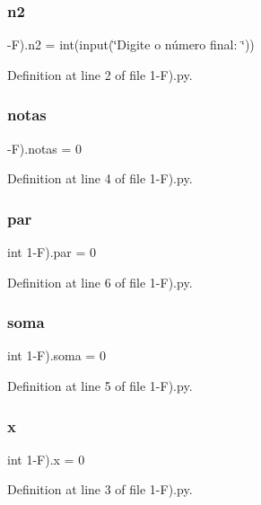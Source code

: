 \subsubsection{n2}
{\footnotesize{}-\/F).n2 = int(input(\char`\"{}Digite o número final\+: \char`\"{}))}



Definition at line 2 of file 1-\/\+F).\+py.

\mbox{\label{namespace1-_f_08_ae5ee231d2cd92f7b0715434b27df1de2}} 
\subsubsection{notas}
{\footnotesize{}-\/F).notas = 0}



Definition at line 4 of file 1-\/\+F).\+py.

\mbox{\label{namespace1-_f_08_afc12ddaa67e43260f028d13663bc3cc6}} 
\subsubsection{par}
{\footnotesize\ttfamily int 1-\/F).par = 0}



Definition at line 6 of file 1-\/\+F).\+py.

\mbox{\label{namespace1-_f_08_ac2bb87f0483755b71d396ef55ccd4c47}} 
\subsubsection{soma}
{\footnotesize\ttfamily int 1-\/F).soma = 0}



Definition at line 5 of file 1-\/\+F).\+py.

\mbox{\label{namespace1-_f_08_ab9185215d164f518f8b5bd95b891d66c}} 
\subsubsection{x}
{\footnotesize\ttfamily int 1-\/F).x = 0}



Definition at line 3 of file 1-\/\+F).\+py.

